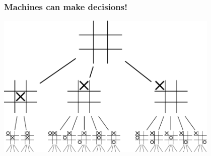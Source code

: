 \documentclass{beamer}
\begin{document}
\begin{frame}
  \frametitle{Machines can make decisions!}
  \begin{center}
    \includegraphics[width=0.8\textwidth]{figures/Tic-tac-toe-game-tree}
  \end{center}
\end{frame}
\end{document}
